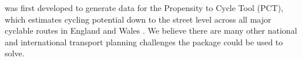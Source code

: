  was first developed to generate data for the Propensity to Cycle Tool (PCT), which estimates cycling potential down to the street level across all major cyclable routes in England and Wales \citep{lovelace_propensity_2017}.
We believe there are many other national and international transport planning challenges the package could be used to solve.
%
%
